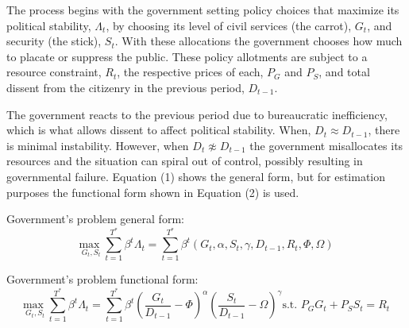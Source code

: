 \documentclass[12pt]{article}
\begin{document}
\begin{spacing}{1.5}

The process begins with the government setting policy choices that maximize its political stability, $\Lambda_t$, by choosing its level of civil services (the carrot), $G_t$, and security (the stick), $S_t$. With these allocations the government chooses how much to placate or suppress the public. These policy allotments are subject to a resource constraint, $R_t$, the respective prices of each, $P_G$ and $P_S$, and total dissent from the citizenry in the previous period, $D_{t-1}$. 

The government reacts to the previous period due to bureaucratic inefficiency, which is what allows dissent to affect political stability. When, $D_t \approx D_{t-1}$, there is minimal instability. However, when $D_t \not\approx D_{t-1}$ the government misallocates its resources and the situation can spiral out of control, possibly resulting in governmental failure. Equation (1) shows the general form, but for estimation purposes the functional form shown in Equation (2) is used. 


\noindent Government's problem general form:
\begin{equation}
{\underset{G_t,S_t}{\text{max }}} \sum\limits_{t=1}^{T^*} \beta^t {\Lambda}_t = \sum\limits_{t=1}^{T^*} \beta^t\left(G_t,\alpha, S_t,\gamma ,D_{t-1},R_t,\Phi,\Omega \right)   
\end{equation}

\vspace{.5 em}

\noindent Government's problem functional form:
\begin{equation}
{\underset{G_t,S_t}{\text{max }}} \sum\limits_{t=1}^{T^*} \beta^t {\Lambda}_t = \sum\limits_{t=1}^{T^*} \beta^t\left(\frac{G_t}{D_{t-1}}-\Phi\right)^\alpha \left(\frac{S_t}{D_{t-1}}-\Omega\right)^\gamma   \text{s.t. } P_G G_t+ P_S S_t=R_t
\end{equation}
 

\end{spacing}
\end{document}
